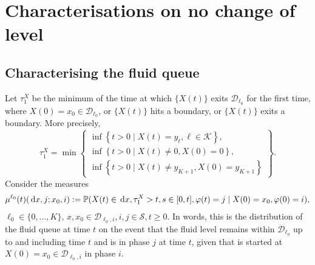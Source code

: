 

\section{Characterisations on no change of level}\label{sec: no change}
\subsection{Characterising the fluid queue}
Let \(\tau_1^X\) be the minimum of the time at which \(\{X(t)\}\) exits \(\mathcal D_{\ell_0}\) for the first time, where \(X(0)=x_0\in\mathcal D_{\ell_0}\), or \(\{X(t)\}\) hits a boundary, or \(\{X(t)\}\) exits a boundary. More precisely, 
\[\tau_1^X = \min\left\{\begin{array}{c}\inf\left\{t>0\mid X(t)=y_{\ell}, \ell\in\mathcal K\right\}, \\ \inf\left\{t>0 \mid X(t) \neq 0, X(0)=0\right\}, \\ \inf\left\{t>0 \mid X(t) \neq y_{K+1}, X(0)=y_{K+1}\right\} \end{array} \right\}.\]
Consider the measures 
\begin{align}\label{eqn: sojourn}
	\mu^{\ell_0}(t)(\, \mathrm{d} x,j; x_0,i) := \mathbb P(X(t)\in \, \mathrm{d} x, \tau_1^X>t, s\in[0,t], \varphi(t) = j \mid X(0) = x_0, \varphi(0) = i),
\end{align}
\(\ell_0\in\{0,\dots,K\}\), \(x,x_0 \in\mathcal D_{\ell_0,i}, i,j\in\mathcal S, t \geq 0. \)
In words, this is the distribution of the fluid queue at time \(t\) on the event that the fluid level remains within \(\mathcal D_{\ell_0}\) up to and including time \(t\) and is in phase \(j\) at time \(t\), given that is started at \(X(0)=x_0\in\mathcal D_{\ell_0,i}\) in phase \(i\). 

